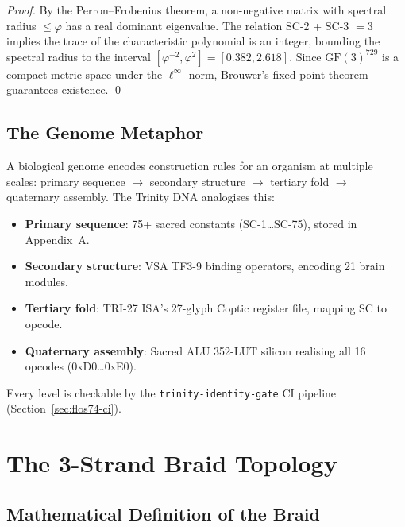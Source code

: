 \begin{proof}
By the Perron--Frobenius theorem, a non-negative matrix with spectral radius
\(\le \varphi\) has a real dominant eigenvalue.
The relation SC-2 + SC-3 \(= 3\) implies the trace of the characteristic
polynomial is an integer, bounding the spectral radius to the interval
\([\varphi^{-2},\varphi^2] = [0.382, 2.618]\).
Since \(\mathrm{GF}(3)^{729}\) is a compact metric space under the
\(\ell^\infty\) norm, Brouwer's fixed-point theorem guarantees existence.
\qed
\end{proof}

\subsection{The Genome Metaphor}

A biological genome encodes construction rules for an organism at multiple scales:
primary sequence \(\to\) secondary structure \(\to\) tertiary fold \(\to\) quaternary
assembly.
The Trinity DNA analogises this:

\begin{itemize}
  \item \textbf{Primary sequence}: 75+ sacred constants (SC-1\ldots SC-75), stored in Appendix~A.
  \item \textbf{Secondary structure}: VSA TF3-9 binding operators, encoding 21 brain modules.
  \item \textbf{Tertiary fold}: TRI-27 ISA's 27-glyph Coptic register file, mapping SC to opcode.
  \item \textbf{Quaternary assembly}: Sacred ALU 352-LUT silicon realising all 16 opcodes
        (0xD0\ldots0xE0).
\end{itemize}

Every level is checkable by the \texttt{trinity-identity-gate} CI pipeline
(Section~\ref{sec:flos74-ci}).


\section{The 3-Strand Braid Topology}
\label{sec:flos74-braid}

\subsection{Mathematical Definition of the Braid}

